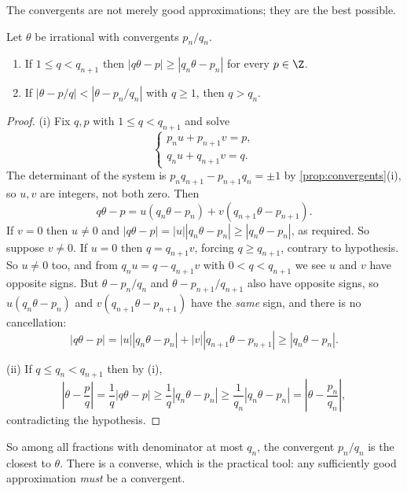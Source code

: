The convergents are not merely good approximations; they are the best possible.

\begin{theorem}\label{thm:bestapprox}
	Let $\theta$ be irrational with convergents $p_n/q_n$.
	\begin{enumerate}[label=(\roman*)]
		\item If $1 \leq q < q_{n+1}$ then $|q\theta - p| \geq |q_n\theta - p_n|$ for every $p \in \Z$.
		\item If $|\theta - p/q| < |\theta - p_n/q_n|$ with $q \geq 1$, then $q > q_n$.
	\end{enumerate}
\end{theorem}
\begin{proof}
	(i) Fix $q, p$ with $1 \leq q < q_{n+1}$ and solve
	$$
	\begin{cases} p_nu + p_{n+1}v = p, \\ q_nu+q_{n+1}v = q.\end{cases}
	$$
	The determinant of the system is $p_nq_{n+1} - p_{n+1}q_n = \pm1$ by \autoref{prop:convergents}(i), so $u, v$ are integers, not both zero. Then
	$$
	q\theta - p = u(q_n\theta - p_n) + v(q_{n+1}\theta - p_{n+1}).
	$$
	If $v = 0$ then $u \neq 0$ and $|q\theta - p| = |u||q_n\theta-p_n| \geq |q_n\theta - p_n|$, as required. So suppose $v \neq 0$. If $u = 0$ then $q = q_{n+1}v$, forcing $q \geq q_{n+1}$, contrary to hypothesis. So $u \neq 0$ too, and from $q_nu = q - q_{n+1}v$ with $0 < q < q_{n+1}$ we see $u$ and $v$ have opposite signs. But $\theta - p_n/q_n$ and $\theta - p_{n+1}/q_{n+1}$ also have opposite signs, so $u(q_n\theta - p_n)$ and $v(q_{n+1}\theta - p_{n+1})$ have the \emph{same} sign, and there is no cancellation:
	$$
	|q\theta - p| = |u||q_n\theta - p_n| + |v||q_{n+1}\theta - p_{n+1}| \geq |q_n\theta - p_n|.
	$$

	(ii) If $q \leq q_n < q_{n+1}$ then by (i),
	$$
	\left|\theta - \frac pq\right| = \frac1q|q\theta - p| \geq \frac1q|q_n\theta - p_n| \geq \frac1{q_n}|q_n\theta - p_n| = \left|\theta - \frac{p_n}{q_n}\right|,
	$$
	contradicting the hypothesis.
\end{proof}

So among all fractions with denominator at most $q_n$, the convergent $p_n/q_n$ is the closest to $\theta$. There is a converse, which is the practical tool: any sufficiently good approximation \emph{must} be a convergent.

